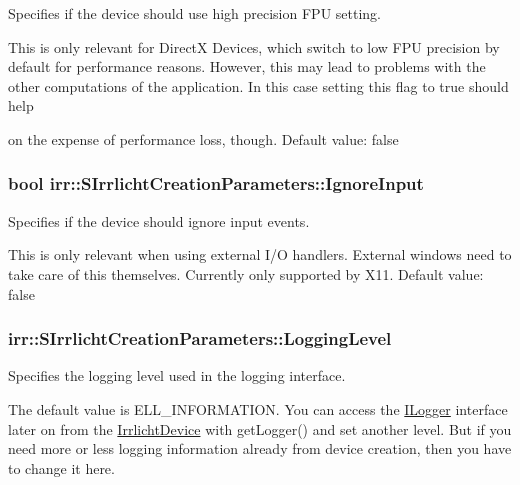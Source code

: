 Specifies if the device should use high precision F\+PU setting. 

This is only relevant for DirectX Devices, which switch to low F\+PU precision by default for performance reasons. However, this may lead to problems with the other computations of the application. In this case setting this flag to true should help
\begin{DoxyItemize}
\item on the expense of performance loss, though. Default value\+: false 
\end{DoxyItemize}
\subsubsection[{\texorpdfstring{Ignore\+Input}{IgnoreInput}}]{\setlength{\rightskip}{0pt plus 5cm}bool irr\+::\+S\+Irrlicht\+Creation\+Parameters\+::\+Ignore\+Input}\hypertarget{structirr_1_1SIrrlichtCreationParameters_acf9aee48aa9193f025f5f855d5a147cb}{}\label{structirr_1_1SIrrlichtCreationParameters_acf9aee48aa9193f025f5f855d5a147cb}


Specifies if the device should ignore input events. 

This is only relevant when using external I/O handlers. External windows need to take care of this themselves. Currently only supported by X11. Default value\+: false 
\subsubsection[{\texorpdfstring{Logging\+Level}{LoggingLevel}}]{ irr\+::\+S\+Irrlicht\+Creation\+Parameters\+::\+Logging\+Level}\hypertarget{structirr_1_1SIrrlichtCreationParameters_a2aa305ffabdd842084ddef5014b3e411}{}\label{structirr_1_1SIrrlichtCreationParameters_a2aa305ffabdd842084ddef5014b3e411}


Specifies the logging level used in the logging interface. 

The default value is E\+L\+L\+\_\+\+I\+N\+F\+O\+R\+M\+A\+T\+I\+ON. You can access the \hyperlink{classirr_1_1ILogger}{I\+Logger} interface later on from the \hyperlink{classirr_1_1IrrlichtDevice}{Irrlicht\+Device} with get\+Logger() and set another level. But if you need more or less logging information already from device creation, then you have to change it here. 
